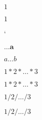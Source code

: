\documentclass{article}
\begin{document}
$1$

{\huge $1$}


{\catcode`
\global\let\zast=*}
\let\zslash/

$\dots\boldsymbol{a}$

$ a \dots b $

$ 1 * 2 * \dots * 3 $

$ 1 \zast 2 \zast  \dots \zast 3 $

$ 1 / 2 / \dots / 3 $

$ 1 \zslash 2 \zslash  \dots \zslash 3 $
\end{document}

